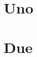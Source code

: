 \documentclass[a4paper,twoside]{book}
\begin{document}
     


\chapter{Uno}


\chapter{Due}



\end{document}
